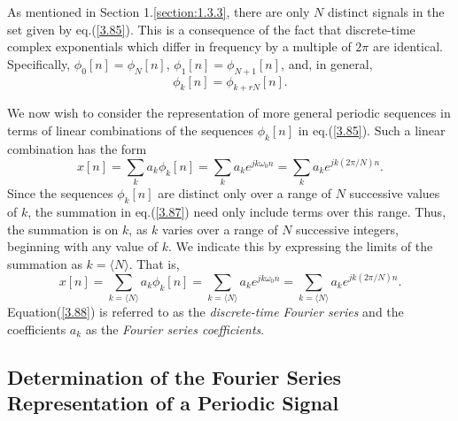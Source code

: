 \documentclass[a4paper,twoside]{book}
\begin{document}
As mentioned in Section 1.\ref{section:1.3.3}, there are only $N$ distinct signals in the set given by eq.\;(\ref{3.85}). This is a consequence of the fact that discrete-time complex exponentials which differ in frequency by a multiple of $2\pi$ are identical. Specifically, $\phi_0[n]=\phi_N[n]$, $\phi_1[n]=\phi_{N+1}[n]$, and, in general,
\begin{equation}
    \phi_k[n]=\phi_{k+rN}[n].
    \label{3.86}
\end{equation}

We now wish to consider the representation of more general periodic sequences in terms of linear combinations of the sequences $\phi_k[n]$ in eq.\;(\ref{3.85}). Such a linear combination has the form
\begin{equation}
    x[n]=\sum_ka_k\phi_k[n]=\sum_ka_ke^{jk\omega_0n}=\sum_ka_ke^{jk(2\pi/N)n}.
    \label{3.87}
\end{equation}
Since the sequences $\phi_k[n]$ are distinct only over a range of $N$ successive values of $k$, the summation in eq.\;(\ref{3.87}) need only include terms over this range. Thus, the summation is on $k$, as $k$ varies over a range of $N$ successive integers, beginning with any value of $k$. We indicate this by expressing the limits of the summation as $k=\langle N\rangle$. That is,
\begin{equation}
    x[n]=\sum_{k=\langle N\rangle}a_{k}\phi_{k}[n]=\sum_{k=\langle N\rangle}a_{k}e^{jk\omega_{0}n}=\sum_{k=\langle N\rangle}a_{k}e^{jk(2\pi/N)n}.
    \label{3.88}
\end{equation}
Equation\;(\ref{3.88}) is referred to as the \textit{discrete-time Fourier series} and the coefficients $a_k$ as the \textit{Fourier series coefficients}.

\subsection{Determination of the Fourier Series Representation of a Periodic Signal}
\end{document}

